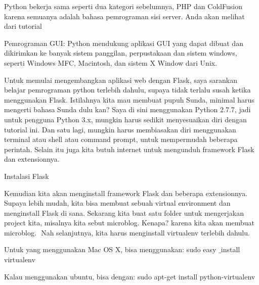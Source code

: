 \vspace{14pt}
\noindent 
{\fontsize{14pt}{14pt}\selectfont Python bekerja sama seperti dua kategori sebelumnya, PHP dan ColdFusion karena semuanya adalah bahasa pemrograman sisi server. Anda akan melihat dari tutorial \\} \par
\noindent 
{\fontsize{14pt}{14pt}\selectfont Pemrograman GUI: Python mendukung aplikasi GUI yang dapat dibuat dan dikirimkan ke banyak sistem panggilan, perpustakaan dan sistem windows, seperti Windows MFC, Macintosh, dan sistem X Window dari Unix. \\} \par
\vspace{14pt}
\noindent 
{\fontsize{14pt}{14pt}\selectfont Untuk memulai mengembangkan aplikasi web dengan Flask, saya sarankan belajar pemrograman python terlebih dahulu, supaya tidak terlalu susah ketika menggunakan Flask. Istilahnya kita mau membuat pupuh Sunda, minimal harus mengerti bahasa Sunda dulu kan? Saya di sini menggunakan Python 2.7.7, jadi untuk pengguna Python 3.x, mungkin harus sedikit menyesuaikan diri dengan tutorial ini. Dan satu lagi, mungkin harus membiasakan diri menggunakan terminal atau shell atau command prompt, untuk mempermudah beberapa perintah. Selain itu juga kita butuh internet untuk mengunduh framework Flask dan extensionnya. \\} \par
\noindent 
{\fontsize{14pt}{14pt}\selectfont Instalasi Flask \\} \par
\noindent 
{\fontsize{14pt}{14pt}\selectfont Kemudian kita akan menginstall framework Flask dan beberapa extensionnya. Supaya lebih mudah, kita bisa membuat sebuah virtual environment dan menginstall Flask di sana. Sekarang kita buat satu folder untuk mengerjakan project kita, misalnya kita sebut microblog. Kenapa? karena kita akan membuat microblog. $  $ $  $Nah selanjutnya, kita harus menginstall virtualenv terlebih dahulu. \\} \par
\noindent 
{\fontsize{14pt}{14pt}\selectfont Untuk yang menggunakan Mac OS X, bisa menggunakan:\vspace{\baselineskip}
sudo easy $  \_  $install virtualenv \\} \par
\noindent 
{\fontsize{14pt}{14pt}\selectfont Kalau menggunakan ubuntu, bisa dengan:\vspace{\baselineskip}
sudo apt-get install python-virtualenv \\} \par

